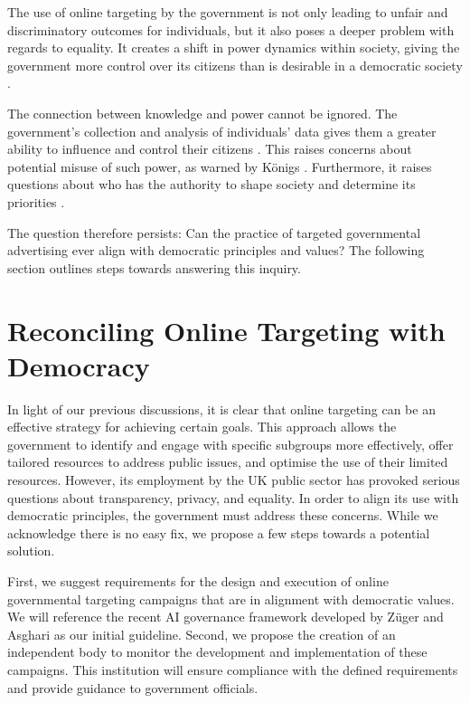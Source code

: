 \documentclass[preprint]{acmart}
\begin{document}
The use of online targeting by the government is not only leading to unfair and discriminatory outcomes for individuals, but it also poses a deeper problem with regards to equality. It creates a shift in power dynamics within society, giving the government more control over its citizens than is desirable in a democratic society \cite{zuboff2015big}.

The connection between knowledge and power cannot be ignored. The government's collection and analysis of individuals' data gives them a greater ability to influence and control their citizens \cite{veliz2020}. This raises concerns about potential misuse of such power, as warned by Königs \cite{konigs2022}. Furthermore, it raises questions about who has the authority to shape society and determine its priorities \cite{Collier2022}.



The question therefore persists: Can the practice of targeted governmental advertising ever align with democratic principles and values? The following section outlines steps towards answering this inquiry.



\section{Reconciling Online Targeting with Democracy }


In light of our previous discussions, it is clear that online targeting can be an effective strategy for achieving certain goals. This approach allows the government to identify and engage with specific subgroups more effectively, offer tailored resources to address public issues, and optimise the use of their limited resources. However, its employment by the UK public sector has provoked serious questions about transparency, privacy, and equality. In order to align its use with democratic principles, the government must address these concerns. While we acknowledge there is no easy fix, we propose a few steps towards a potential solution.


First, we suggest requirements for the design and execution of online governmental targeting campaigns that are in alignment with democratic values. We will reference the recent AI governance framework developed by Züger and Asghari \cite{zuger2022} as our initial guideline. Second, we propose the creation of an independent body to monitor the development and implementation of these campaigns. This institution will ensure compliance with the defined requirements and provide guidance to government officials.
\end{document}
